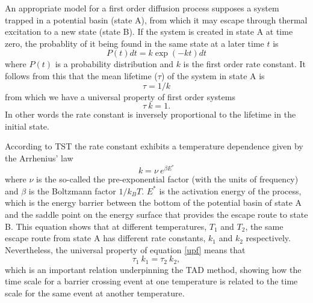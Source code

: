 An appropriate model for a first order diffusion process supposes a
system trapped in a potential basin (state A), from which it may
escape through thermal excitation to a new state (state B). If the
system is created in state A at time zero, the probablity of it being
found in the same state at a later time $t$ is
\begin{equation}
P(t)dt=k \exp(-k t) dt
\end{equation}
where $P(t)$ is a probability distribution and $k$ is the first order
rate constant. It follows from this that the mean lifetime ($\tau$) of
the system in state A is
\begin{equation}
	\tau=1/k
\end{equation}
from which we have a universal property of first order systems
\begin{equation}
\tau~k=1. \label{upf}
\end{equation}
In other words the rate constant is inversely proportional to the
lifetime in the initial state.

According to TST the rate constant exhibits a temperature dependence
given by the Arrhenius' law
\begin{equation}
k=\nu~e^{\beta E^{*}} \label{arrhenius}
\end{equation}
where $\nu$ is the so-called the pre-exponential factor (with the
units of frequency) and $\beta $ is the Boltzmann factor $1/k_B T$.
$E^{*}$ is the activation energy of the process, which
is the energy barrier between the bottom of the potential basin of
state A and the saddle point on the energy surface
that provides the escape route to state B. This equation shows that at
different temperatures, $T_1$ and $T_2$, the same escape route from
state A has different rate constants, $k_1$ and $k_2$
respectively. Nevertheless, the universal property of equation
\ref{upf} means that
\begin{equation}
\tau_1~k_1=\tau_2~k_2, \label{tad1}
\end{equation}
which is an important relation underpinning the TAD method, showing
how the time scale for a barrier crossing event at one temperature is
related to the time scale for the same event at another temperature.

